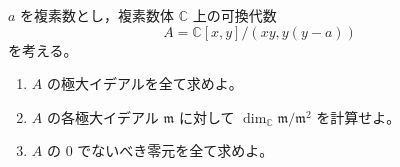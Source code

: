 \documentclass[12pt]{jlreq}
\newcommand{\C}{\mathbb{C}}
\begin{document}
\(a\) を複素数とし，複素数体 \(\C\) 上の可換代数
\[
  A=\C[x,y]/(xy,y(y-a))
\]
を考える。

\begin{enumerate}
  \item \(A\) の極大イデアルを全て求めよ。
  \item \(A\) の各極大イデアル \(\mathfrak m\) に対して \(\dim_{\C}\mathfrak m/\mathfrak m^2\) を計算せよ。
  \item \(A\) の \(0\) でないべき零元を全て求めよ。
\end{enumerate}
\end{document}
